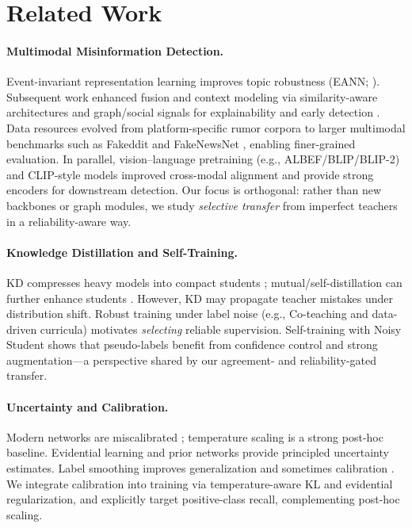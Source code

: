 \section{Related Work}
\paragraph{Multimodal Misinformation Detection.}
Event-invariant representation learning improves topic robustness (EANN; \citealp{Wang2018EANN}). Subsequent work enhanced fusion and context modeling via similarity-aware architectures \citep{Zhou2020SAFE} and graph/social signals for explainability and early detection \citep{Lu2020GCAN,Nguyen2020FANG}. Data resources evolved from platform-specific rumor corpora to larger multimodal benchmarks such as Fakeddit \citep{Nakamura2020Fakeddit} and FakeNewsNet \citep{Shu2020FakeNewsNet}, enabling finer-grained evaluation. In parallel, vision--language pretraining (e.g., ALBEF/BLIP/BLIP-2) \citep{Li2021ALBEF,Li2022BLIP,Li2023BLIP2} and CLIP-style models \citep{Radford2021CLIP} improved cross-modal alignment and provide strong encoders for downstream detection. Our focus is orthogonal: rather than new backbones or graph modules, we study \emph{selective transfer} from imperfect teachers in a reliability-aware way.

\paragraph{Knowledge Distillation and Self-Training.}
KD compresses heavy models into compact students \citep{Hinton2015Distillation,Gou2021KDsurvey}; mutual/self-distillation can further enhance students \citep{Zhang2018DML,Furlanello2018BAN}. However, KD may propagate teacher mistakes under distribution shift. Robust training under label noise (e.g., Co-teaching and data-driven curricula) \citep{Han2018Coteaching,MentorNet2018} motivates \emph{selecting} reliable supervision. Self-training with Noisy Student \citep{Xie2020NoisyStudent} shows that pseudo-labels benefit from confidence control and strong augmentation---a perspective shared by our agreement- and reliability-gated transfer.

\paragraph{Uncertainty and Calibration.}
Modern networks are miscalibrated \citep{Guo2017Calibration}; temperature scaling is a strong post-hoc baseline. Evidential learning \citep{Sensoy2018EDL} and prior networks \citep{Malinin2018PN} provide principled uncertainty estimates. Label smoothing improves generalization and sometimes calibration \citep{Muller2019LabelSmoothing}. We integrate calibration into training via temperature-aware KL and evidential regularization, and explicitly target positive-class recall, complementing post-hoc scaling.

